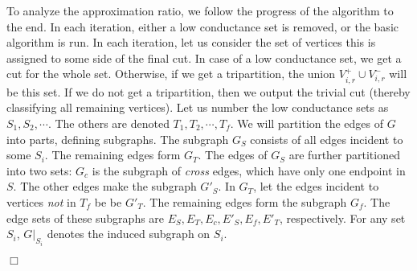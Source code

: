 \documentclass[11pt]{article}
\newenvironment{myproof}{\noindent {\sc Proof:}}{$\Box$}
\begin{document}
\begin{myproof} To analyze the approximation ratio, we follow the progress of the algorithm
to the end. In each iteration, either a low conductance set is removed,
or the basic algorithm is run. In each iteration, let us consider
the set of vertices this is assigned to some side of the final cut.
In case of a low conductance set, we get a cut for the whole set.
Otherwise, if we get a tripartition, the union $V_{i,r}^+ \cup V_{i,r}^-$
will be this set. If we do not get a tripartition,
then we output the trivial cut (thereby classifying all remaining vertices).
Let us number the low conductance sets
as $S_1, S_2, \cdots$. The others are denoted $T_1,T_2,\cdots,T_f$.
We will partition the edges of $G$ into parts, defining subgraphs.
The subgraph $G_S$ consists of all edges incident to some
$S_i$. The remaining edges form $G_T$. The
edges of $G_S$ are further partitioned into two sets:
$G_c$ is the subgraph of \emph{cross} edges, which have only
one endpoint in $S$. The other edges make the subgraph $G'_S$.
In $G_T$, let the edges incident to vertices \emph{not} in
$T_f$ be be $G'_T$. The remaining edges form the subgraph $G_f$.
The edge sets of these subgraphs are $E_S, E_T, E_c, E'_S, E_f, E'_T$,
respectively. For any set $S_i$, $G|_{S_i}$ denotes
the induced subgraph on $S_i$.


\end{myproof}
\end{document}
